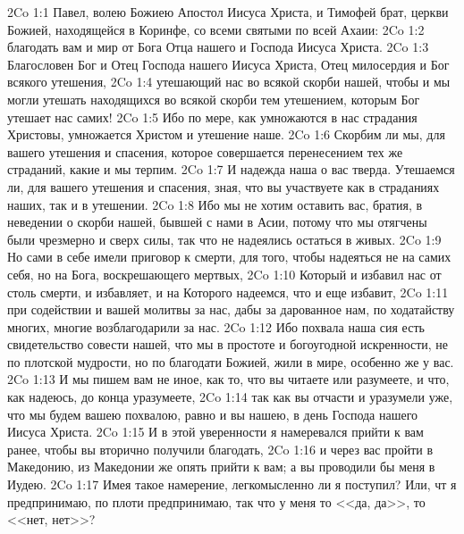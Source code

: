 \vs 2Co 1:1 Павел, волею Божиею Апостол Иисуса Христа, и Тимофей брат, церкви Божией, находящейся в Коринфе, со всеми святыми по всей Ахаии:
\vs 2Co 1:2 благодать вам и мир от Бога Отца нашего и Господа Иисуса Христа.
\rsbpar\vs 2Co 1:3 Благословен Бог и Отец Господа нашего Иисуса Христа, Отец милосердия и Бог всякого утешения,
\vs 2Co 1:4 утешающий нас во всякой скорби нашей, чтобы и мы могли утешать находящихся во всякой скорби тем утешением, которым Бог утешает нас самих!
\vs 2Co 1:5 Ибо по мере, как умножаются в нас страдания Христовы, умножается Христом и утешение наше.
\vs 2Co 1:6 Скорбим ли мы,  для вашего утешения и спасения, которое совершается перенесением тех же страданий, какие и мы терпим.
\vs 2Co 1:7 И надежда наша о вас тверда. Утешаемся ли,  для вашего утешения и спасения, зная, что вы участвуете как в страданиях наших, так и в утешении.
\rsbpar\vs 2Co 1:8 Ибо мы не хотим оставить вас, братия, в неведении о скорби нашей, бывшей с нами в Асии, потому что мы отягчены были чрезмерно и сверх силы, так что не надеялись остаться в живых.
\vs 2Co 1:9 Но сами в себе имели приговор к смерти, для того, чтобы надеяться не на самих себя, но на Бога, воскрешающего мертвых,
\vs 2Co 1:10 Который и избавил нас от столь  смерти, и избавляет, и на Которого надеемся, что и еще избавит,
\vs 2Co 1:11 при содействии и вашей молитвы за нас, дабы за дарованное нам, по ходатайству многих, многие возблагодарили за нас.
\rsbpar\vs 2Co 1:12 Ибо похвала наша сия есть свидетельство совести нашей, что мы в простоте и богоугодной искренности, не по плотской мудрости, но по благодати Божией, жили в мире, особенно же у вас.
\vs 2Co 1:13 И мы пишем вам не иное, как то, что вы читаете или разумеете, и что, как надеюсь, до конца уразумеете,
\vs 2Co 1:14 так как вы отчасти и уразумели уже, что мы будем вашею похвалою, равно и вы нашею, в день Господа нашего Иисуса Христа.
\vs 2Co 1:15 И в этой уверенности я намеревался прийти к вам ранее, чтобы вы вторично получили благодать,
\vs 2Co 1:16 и через вас пройти в Македонию, из Македонии же опять прийти к вам; а вы проводили бы меня в Иудею.
\vs 2Co 1:17 Имея такое намерение, легкомысленно ли я поступил? Или, чт я предпринимаю, по плоти предпринимаю, так что у меня то <<да, да>>, то <<нет, нет>>?
